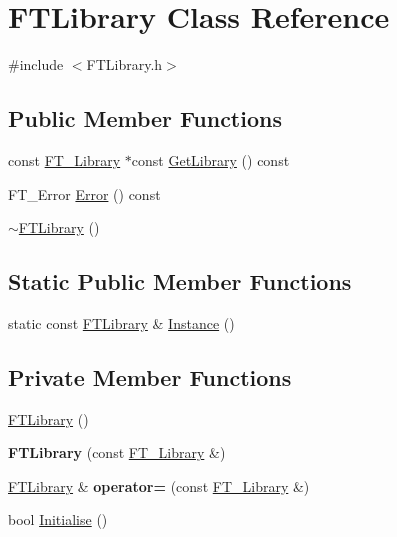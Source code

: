 \hypertarget{class_f_t_library}{}\section{F\+T\+Library Class Reference}
\label{class_f_t_library}


{\ttfamily \#include $<$F\+T\+Library.\+h$>$}

\subsection*{Public Member Functions}
\begin{DoxyCompactItemize}
\item 
const \hyperlink{struct_f_t___library_rec__}{F\+T\+\_\+\+Library} $\ast$const \hyperlink{class_f_t_library_afef4db019eae5a4307201b7abc6a88c7}{Get\+Library} () const 
\item 
F\+T\+\_\+\+Error \hyperlink{class_f_t_library_ad01e538ba8e308dddda5c4ec808ee404}{Error} () const 
\item 
\hyperlink{class_f_t_library_a8d1ee3dc3c4916b5b428e934dc46e9d7}{$\sim$\+F\+T\+Library} ()
\end{DoxyCompactItemize}
\subsection*{Static Public Member Functions}
\begin{DoxyCompactItemize}
\item 
static const \hyperlink{class_f_t_library}{F\+T\+Library} \& \hyperlink{class_f_t_library_aa172665a8db8888851895bcb15aa8103}{Instance} ()
\end{DoxyCompactItemize}
\subsection*{Private Member Functions}
\begin{DoxyCompactItemize}
\item 
\hyperlink{class_f_t_library_acb32a6fc7e298d60e1d071899efab379}{F\+T\+Library} ()
\item 
{\bfseries F\+T\+Library} (const \hyperlink{struct_f_t___library_rec__}{F\+T\+\_\+\+Library} \&)\hypertarget{class_f_t_library_ae0eea39a5a34ae8a4ed083c0a6564a5f}{}\label{class_f_t_library_ae0eea39a5a34ae8a4ed083c0a6564a5f}

\item 
\hyperlink{class_f_t_library}{F\+T\+Library} \& {\bfseries operator=} (const \hyperlink{struct_f_t___library_rec__}{F\+T\+\_\+\+Library} \&)\hypertarget{class_f_t_library_a5e372958c8036ad1d2078fdba729de93}{}\label{class_f_t_library_a5e372958c8036ad1d2078fdba729de93}

\item 
bool \hyperlink{class_f_t_library_a0303d47ece19bb6c5e3192885d53b8ed}{Initialise} ()
\end{DoxyCompactItemize}
